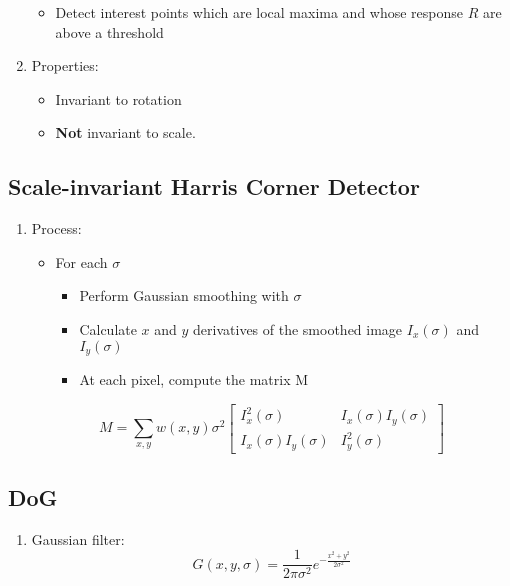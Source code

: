 \documentclass[9pt]{article}
\begin{document}
\begin{multicols*}{2}
\begin{enumerate}
\begin{itemize}
                \item Detect interest points which are local maxima and whose response $R$ are
                above a threshold
            \end{itemize}

            \item Properties:
            \begin{itemize}
                \item Invariant to rotation 
                \item \textbf{Not} invariant to scale. 
            \end{itemize}
        \end{enumerate}

        \subsection{Scale-invariant Harris Corner Detector}
        \begin{enumerate}
            \item Process:
            \begin{itemize}
                \item For each $\sigma$
                \begin{itemize}
                    \item Perform Gaussian smoothing with $\sigma$
                    \item Calculate $x$ and $y$ derivatives of the smoothed image $I_x(\sigma)$ and $I_y(\sigma)$
                    \item At each pixel, compute the matrix M 
                \end{itemize}
            \end{itemize}
            $$
            M = \sum_{x,y} w(x,y)\sigma^2 \begin{bmatrix}
                I_x^2(\sigma) & I_x(\sigma) I_y(\sigma) \\ 
                I_x(\sigma)I_y(\sigma) & I_y^2(\sigma)
            \end{bmatrix}
            $$
        \end{enumerate}
        
        \subsection{DoG}
        \begin{enumerate}
            \item Gaussian filter:
            $$
                G(x,y,\sigma) = \frac{1}{2\pi \sigma^2} e^{-\frac{x^2+y^2}{2\sigma^2}}
            $$


\end{enumerate}
\end{multicols*}
\end{document}
